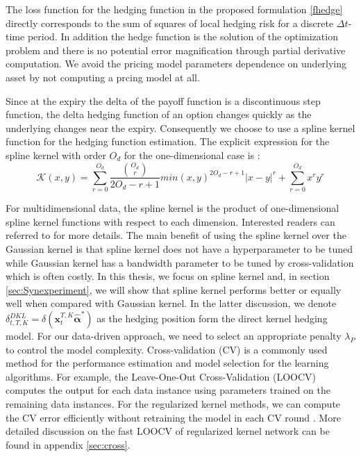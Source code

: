 \documentclass[letterpaper,12pt,titlepage,oneside,final]{book}
\numberwithin{equation}{section}
\theoremstyle{definition}
\newcommand{\vx}{\mathbf{x}}
\newcommand{\DT}{\Delta t}
\newcommand{\valpha}{\pmb{\widehat{\alpha}}}
\begin{document}
The loss function for the hedging function in the proposed formulation \eqref{fhedge}
directly corresponds to the sum of squares of local hedging risk for a discrete $\DT$-time period. In addition the hedge function is the solution of the optimization problem  and there is no potential error magnification through partial derivative computation. We avoid the pricing model parameters dependence on underlying asset by not computing a prcing model at all.




Since at the expiry the delta of the payoff function is a discontinuous step function, the  delta hedging function of an option changes quickly as the underlying changes near the expiry.
Consequently we choose to use a spline kernel function \citep{vapnik1998statistical} for the hedging function estimation.
The explicit expression for the spline kernel with order $O_d$  for the one-dimensional case is :
\[
\mathcal{K}(x,y)=\sum_{r=0}^{O_d} \frac{\binom{O_d}{r}}{2 O_d-r+1} min(x,y)^{2 O_d-r+1}|x-y|^r +\sum_{r=0}^{O_d} x^ry^r
\]

For multidimensional data, the spline kernel is the product of one-dimensional spline kernel functions with respect to each dimension. Interested readers can referred to \citep{vapnik1998statistical} for more details. The main benefit of using the spline kernel over the Gaussian kernel  is that spline kernel does not have a hyperparameter to be tuned while  Gaussian kernel has  a bandwidth parameter to be tuned by cross-validation which is often costly. In this thesis, we focus on spline kernel and, in section 
\ref{sec:Synexperiment}, we will show that spline kernel performs better or equally well when compared with Gaussian kernel.  In the latter discussion, we denote $\delta^{DKL}_{t,T,K}= \delta(\vx_{t}^{T,K}{\valpha}^*)$ as the hedging position form the direct kernel hedging model. For our data-driven approach, we need to select an appropriate penalty $\lambda_P$ to control the model complexity. Cross-validation (CV) is a commonly used method for the performance estimation and model selection for the learning algorithms. For example, the Leave-One-Out Cross-Validation (LOOCV) computes the output for each data instance using parameters trained on the remaining data instances. For the regularized kernel methods, we can compute the CV error efficiently without retraining the model in each CV round \cite{pahikkala2006fast}. More detailed discussion on the fast LOOCV of regularized kernel network \cite{pahikkala2006fast} can be found in appendix \ref{sec:cross}. 
\end{document}
